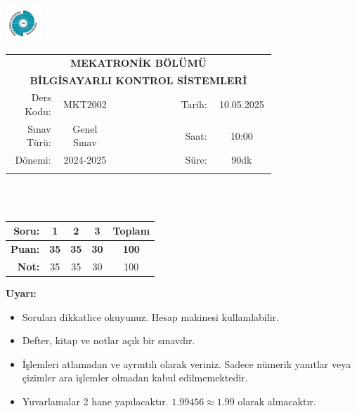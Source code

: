 \newcommand\UniversiteAdi{Niğde Ömer Halisdemir Üniversitesi}
\newcommand\BolumAdi{MEKATRONİK BÖLÜMÜ}
\newcommand\DersKodu{MKT2002}
\newcommand\DersAdi{BİLGİSAYARLI KONTROL SİSTEMLERİ}
\newcommand\SinavAdi{Genel Sınav}
\newcommand\SinavTarihi{10.05.2025}
\newcommand\SinavSaati{10:00}
\newcommand\SinavSuresi{90dk}

\pagestyle{fancy}
\fancyhf{} %
\noindent \includegraphics[width=0.1\textwidth]{logo}
\begin{tabular}{
    p{0.15\linewidth}
    p{0.15\linewidth}
    p{0.2\linewidth}
    p{0.1\linewidth}
    p{0.15\linewidth}}
    \multicolumn{5}{c}{\textbf{\BolumAdi}}\\
    \multicolumn{5}{c}{\textbf{\DersAdi}}\\\hline
    \multicolumn{1}{|r|}{Ders Kodu:}&
    \multicolumn{1}{|c|}{\DersKodu}&
    \multicolumn{1}{|c|}{}& 
    \multicolumn{1}{|r|}{Tarih:}&
    \multicolumn{1}{|c|}{\SinavTarihi} \\\hline
    \multicolumn{1}{|r|}{Sınav Türü:}&
    \multicolumn{1}{|c|}{\SinavAdi}&  
    \multicolumn{1}{|c|}{}&
    \multicolumn{1}{|r|}{Saat:}&
    \multicolumn{1}{|c|}{\SinavSaati}\\\hline
    \multicolumn{1}{|r|}{Dönemi:}&
    \multicolumn{1}{|c|}{2024-2025}&
    \multicolumn{1}{|c|}{}&
    \multicolumn{1}{|r|}{Süre:}&
    \multicolumn{1}{|c|}{\SinavSuresi} \\\hline
    &&&&\\
\end{tabular}\\\\
\noindent\begin{center}
\begin{tabular}{|r|c|c|c|c|}\hline
    \textbf{Soru:}&
    \textbf{1}&
    \textbf{2}&
    \textbf{3}&
    \textbf{Toplam}\\\hline
    \textbf{Puan:}&
    \textbf{35}&
    \textbf{35}&
    \textbf{30}&
    \textbf{100}\\\hline
    \textbf{Not:}&35&35&30&100\\\hline
\end{tabular}\end{center}
\noindent\textbf{Uyarı:}
\begin{itemize}\bfseries
    \item Soruları dikkatlice okuyunuz. Hesap makinesi kullanılabilir.
    \item Defter, kitap ve notlar açık bir sınavdır.
    \item İşlemleri atlamadan ve ayrıntılı olarak veriniz. Sadece nümerik yanıtlar veya çizimler ara işlemler olmadan kabul edilmemektedir.
    \item Yuvarlamalar 2 hane yapılacaktır. $\mathbf{1.99456\approx1.99}$ olarak alınacaktır.
\end{itemize}

